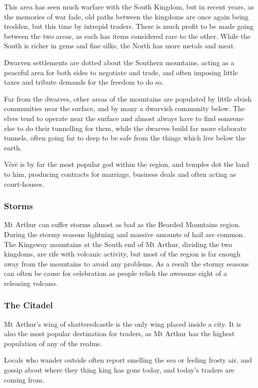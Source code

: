 \begin{multicols}{2}
This area has seen much warfare with the South Kingdom, but in recent years, as the memories of war fade, old paths between the kingdoms are once again being trodden, but this time by intrepid traders.
There is much profit to be made going between the two areas, as each has items considered rare to the other.
While the South is richer in gems and fine silks, the North has more metals and meat.

Dwarven settlements are dotted about the Southern mountains, acting as a peaceful area for both sides to negotiate and trade, and often imposing little taxes and tribute demands for the freedom to do so.

Far from the dwarves, other areas of the mountains are populated by little elvish communities near the surface, and by many a dwarvish community below.  The elves tend to operate near the surface and almost always have to find someone else to do their tunnelling for them, while the dwarves build far more elaborate tunnels, often going far to deep to be safe from the things which live below the earth.

V\'{e}r\"{e} is by far the most popular god within the region, and temples dot the land to him, producing contracts for marriage, business deals and often acting as court-houses.

\subsubsection{Storms}

Mt Arthur can suffer storms almost as bad as the Bearded Mountains region.
During the stormy seasons lightning and massive amounts of hail are common.
The Kingsway mountains at the South end of Mt Arthur, dividing the two kingdoms, are rife with volcanic activity, but most of the region is far enough away from the mountains to avoid any problems.
As a result the stormy seasons can often be cause for celebration as people relish the awesome sight of a releasing volcano.

\subsubsection{The Citadel}

Mt Arthur's wing of \gls{shatteredcastle} is the only wing placed inside a city.
It is also the most popular destination for traders, as Mt Arthur has the highest population of any of the realms.

Locals who wander outside often report smelling the sea or feeling frosty air, and gossip about where they thing \gls{king} has gone today, and today's traders are coming from.


\end{multicols}
